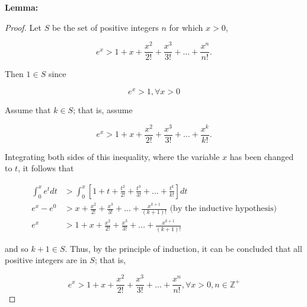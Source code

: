 \documentclass{article}
\begin{document}
    \begin{tcolorbox}[colback = red!10]
        \textbf{Lemma:}
        \begin{proof}
            Let $S$ be the set of positive integers $n$ for which $x>0$,

            \[
                e^x > 1 + x + \frac{x^2}{2!} + \frac{x^3}{3!} + \dots + \frac{x^n}{n!}.
            \]

            Then $1\in S$ since

            \[
                e^x > 1, \forall x > 0
            \]

            Assume that $k\in S$; that is, assume

            \[
                e^x > 1 + x + \frac{x^2}{2!} + \frac{x^3}{3!} + \dots + \frac{x^k}{k!}.
            \]

            Integrating both sides of this inequality, where the variable $x$ has been changed to $t$, it follows that

            \begin{align*}
                \int_{0}^x e^t dt   &> \int_0^x \left[1+t+\frac{t^2}{2!} + \frac{t^3}{3!} + \dots + \frac{t^k}{k!}\right]dt \\
                e^x - e^0           &> x + \frac{x^2}{2!} + \frac{x^3}{3!} + \dots + \frac{x^{k+1}}{(k+1)!} \text{ (by the inductive hypothesis)} \\
                e^x                 &> 1 + x + \frac{x^2}{2!} + \frac{x^3}{3!} + \dots + \frac{x^{k+1}}{(k+1)!}
            \end{align*}

            and so $k+1\in S$. Thus, by the principle of induction, it can be concluded that all positive integers are in $S$; that is,

            \[
                e^x > 1 + x + \frac{x^2}{2!} + \frac{x^3}{3!} + \dots + \frac{x^n}{n!}, \forall x > 0, n\in \mathbb{Z}^+
            \]
        \end{proof}
    \end{tcolorbox}
\end{document}
